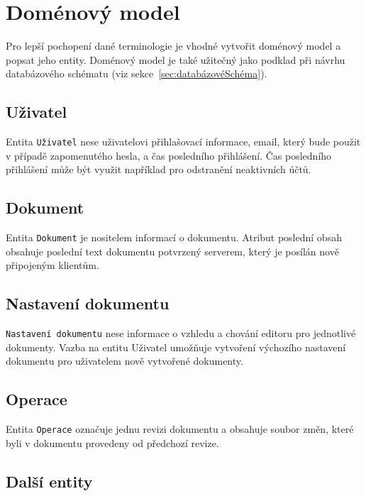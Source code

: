 \section{Doménový model}\label{sec:domenovyModel}

Pro lepší pochopení dané terminologie je vhodné vytvořit doménový model a popsat jeho entity.
Doménový model je také užitečný jako podklad při návrhu databázového schématu (viz sekce~\ref{sec:databázovéSchéma}).

\subsection{Uživatel}\label{subsec:uživatel}

Entita \texttt{Uživatel} nese uživatelovi přihlašovací informace, email, který bude použit v případě zapomenutého hesla, a čas posledního přihlášení.
Čas posledního přihlášení může být využit například pro odstranění neaktivních účtů.

\subsection{Dokument}\label{subsec:dokument}

Entita \texttt{Dokument} je nositelem informací o dokumentu.
Atribut poslední obsah obsahuje poslední text dokumentu potvrzený serverem, který je posílán nově připojeným klientům.

\subsection{Nastavení dokumentu}\label{subsec:nastaveníDokumentu}

\texttt{Nastavení dokumentu} nese informace o vzhledu a chování editoru pro jednotlivé dokumenty.
Vazba na entitu Uživatel umožňuje vytvoření výchozího nastavení dokumentu pro uživatelem nově vytvořené dokumenty.

\subsection{Operace}\label{subsec:operace}

Entita \texttt{Operace} označuje jednu revizi dokumentu a obsahuje soubor změn, které byli v dokumentu provedeny od předchozí revize.

\subsection{Další entity}\label{subsec:dalšíEntity}

